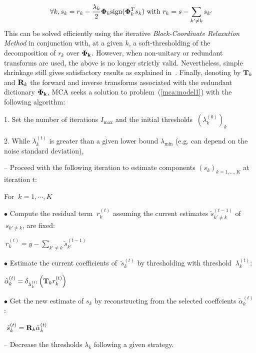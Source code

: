 \begin{equation}
 ~
\forall k, s_k = r_k - \frac{\lambda_k}{2 }  {\bf \Phi}_k  \mbox{sign}( {\bf \Phi}_k^{T} s_k ) \mbox{  with  } r_k = s - \sum_{k' \neq k} s_{k'}
\end{equation}
This can be solved efficiently using the iterative \textit{Block-Coordinate Relaxation Method} \cite{text:Bruce98} 
in conjunction with, at a given $k$, a soft-thresholding of the decomposition of $r_k$ over ${\bf {\bf \Phi}_k}$. 
However, when non-unitary or redundant transforms are used, the above is no longer strictly valid. Nevertheless, 
simple shrinkage still gives satisfactory results as explained in~\cite{miki:shrinkage}. Finally, denoting by 
${\bf T}_k$ and ${\bf R}_k$ the forward and inverse transforms associated with the redundant dictionary 
${\bf {\bf \Phi}_k}$, MCA seeks a solution to problem~(\ref{mca:model1}) with the following algorithm: 
\begin{center}
\begin{minipage}[b]{0.9\linewidth}
\vspace{0.1in}
\footnotesize{\textsf{1. Set the number of iterations $I_{\max}$ and the initial thresholds $ ~ \left(\lambda_k^{(0)}\right)_{k}$}

\textsf{2. While  $\lambda^{(t)}_{k}$ is greater than a given lower bound $\lambda_{\min}$ (e.g. can depend on the noise standard deviation), }

\hspace{0.15in} \textsf{-- Proceed with the following iteration to estimate components $ (s_k)_{k=1,\ldots,K}$ at iteration $t$:}

\hspace{0.25in} \textsf{For $ ~ k=1,\cdots,K$ }

\hspace{0.5in} \textsf{$\bullet$ Compute the residual term $ ~ r_k^{(t)}$ assuming the current estimates $\tilde{s}_{k' \neq k}^{(t-1)}$ of $ ~ s_{k' \neq k}$, are 
fixed:}

\hspace{0.75in} \textsf{ $ ~ r_k^{(t)} = y - \sum_{k' \neq k} \tilde{s}_{k'}^{(t-1)}$}

\hspace{0.5in} \textsf{$\bullet$ Estimate the current coefficients of $ ~ \tilde{s}_k^{(t)}$ by thresholding with threshold $ ~ \lambda_k^{(t)}$:}

\hspace{0.75in} \textsf{$ \tilde{\alpha}_k^{(t)} = \delta_{\lambda_k^{(t)}}\left( {\bf T}_k r_k^{(t)}\right)$}

\hspace{0.5in} \textsf{$\bullet$ Get the new estimate of $ s_k$ by reconstructing from the selected coeffcients $ \tilde{\alpha}_k^{(t)}$ :}

\hspace{0.75in} \textsf{$ ~ \tilde{s}_k^{(t)} = {\bf R}_k \tilde{\alpha}_k^{(t)}$}

\hspace{0.15in} \textsf{-- Decrease the thresholds $\lambda_{k}$ following a given strategy.}
}
\vspace{0.05in}
\end{minipage}
\end{center}
